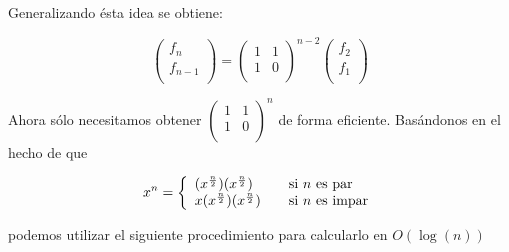Generalizando ésta idea se obtiene:

$$
 \begin{pmatrix}
  f_n \\
  f_{n-1} \\
 \end{pmatrix}
 =
 \begin{pmatrix}
  1 & 1 \\
  1 & 0 \\
 \end{pmatrix}^{n-2}
 \begin{pmatrix}
  f_2 \\
  f_1 \\
 \end{pmatrix}
$$

Ahora sólo necesitamos obtener 
$\begin{pmatrix}
  1 & 1 \\
  1 & 0 \\
 \end{pmatrix}^n$ de forma eficiente. Basándonos en el hecho de que
 
 $$
 x^n = \left\{ 
  \begin{array}{l l}
    (x^{n \over 2})(x^{n \over 2}) & \quad \text{si $n$ es par}\\
    x(x^{n \over 2})(x^{n \over 2}) & \quad \text{si $n$ es impar}
  \end{array} \right.
$$

podemos utilizar el siguiente procedimiento para calcularlo en $O(\log(n))$

